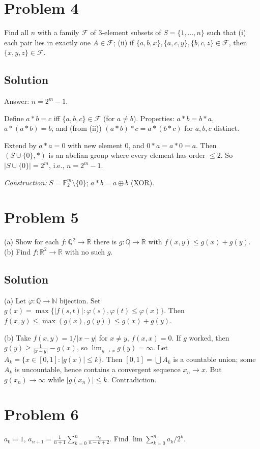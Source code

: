 \documentclass{article}
\begin{document}
\section*{Problem 4}
Find all $n$ with a family $\mathcal F$ of 3-element subsets of $S = \{1, \ldots, n\}$ such that (i) each pair lies in exactly one $A \in \mathcal F$; (ii) if $\{a,b,x\}, \{a,c,y\}, \{b,c,z\} \in \mathcal F$, then $\{x, y, z\} \in \mathcal F$.

\subsection*{Solution}
Answer: $n = 2^m - 1$.

Define $a * b = c$ iff $\{a, b, c\} \in \mathcal F$ (for $a \ne b$). Properties: $a * b = b * a$, $a * (a * b) = b$, and (from (ii)) $(a * b) * c = a * (b * c)$ for $a, b, c$ distinct.

Extend by $a * a = 0$ with new element $0$, and $0 * a = a * 0 = a$. Then $(S \cup \{0\}, *)$ is an abelian group where every element has order $\le 2$. So $|S \cup \{0\}| = 2^m$, i.e., $n = 2^m - 1$.

\emph{Construction:} $S = \mathbb{F}_2^m \setminus \{0\}$; $a * b = a \oplus b$ (XOR).

\section*{Problem 5}
(a) Show for each $f : \mathbb{Q}^2 \to \mathbb{R}$ there is $g : \mathbb{Q} \to \mathbb{R}$ with $f(x, y) \le g(x) + g(y)$.
(b) Find $f : \mathbb{R}^2 \to \mathbb{R}$ with no such $g$.

\subsection*{Solution}
(a) Let $\varphi : \mathbb{Q} \to \mathbb{N}$ bijection. Set $g(x) = \max\{|f(s, t)| : \varphi(s), \varphi(t) \le \varphi(x)\}$. Then $f(x, y) \le \max(g(x), g(y)) \le g(x) + g(y)$.

(b) Take $f(x, y) = 1/|x - y|$ for $x \ne y$, $f(x, x) = 0$. If $g$ worked, then $g(y) \ge \tfrac{1}{|x-y|} - g(x)$, so $\lim_{y \to x} g(y) = \infty$. Let $A_k = \{x \in [0,1] : |g(x)| \le k\}$. Then $[0,1] = \bigcup A_k$ is a countable union; some $A_k$ is uncountable, hence contains a convergent sequence $x_n \to x$. But $g(x_n) \to \infty$ while $|g(x_n)| \le k$. Contradiction.

\section*{Problem 6}
$a_0 = 1$, $a_{n+1} = \tfrac{1}{n+1} \sum_{k=0}^n \tfrac{a_k}{n - k + 2}$. Find $\lim \sum_{k=0}^n a_k / 2^k$.
\end{document}
